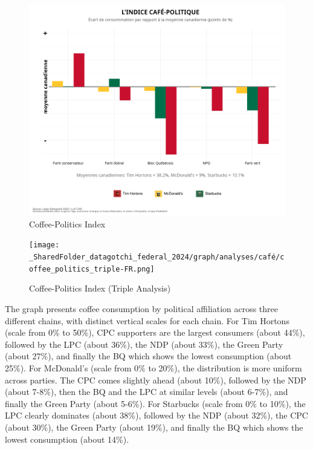 \documentclass[
  letterpaper,
  DIV=11,
  numbers=noendperiod]{scrartcl}
\begin{document}
\begin{figure}[H]

{\centering \includegraphics[width=1\textwidth,height=\textheight]{img/cafe_graph.png}

}

\caption{Coffee-Politics Index}

\end{figure}%
\begin{figure}[H]

{\centering \texttt{[image: \_SharedFolder\_datagotchi\_federal\_2024/graph/analyses/café/coffee\_politics\_triple-FR.png]}

}

\caption{Coffee-Politics Index (Triple Analysis)}

\end{figure}%

The graph presents coffee consumption by political affiliation across
three different chains, with distinct vertical scales for each chain.
For Tim Hortons (scale from 0\% to 50\%), CPC supporters are the largest
consumers (about 44\%), followed by the LPC (about 36\%), the NDP (about
33\%), the Green Party (about 27\%), and finally the BQ which shows the
lowest consumption (about 25\%). For McDonald's (scale from 0\% to
20\%), the distribution is more uniform across parties. The CPC comes
slightly ahead (about 10\%), followed by the NDP (about 7-8\%), then the
BQ and the LPC at similar levels (about 6-7\%), and finally the Green
Party (about 5-6\%). For Starbucks (scale from 0\% to 10\%), the LPC
clearly dominates (about 38\%), followed by the NDP (about 32\%), the
CPC (about 30\%), the Green Party (about 19\%), and finally the BQ which
shows the lowest consumption (about 14\%).
\end{document}
